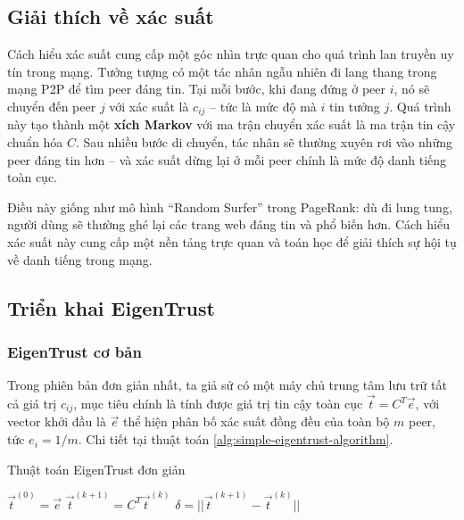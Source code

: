 \subsection{Giải thích về xác suất}

Cách hiểu xác suất cung cấp một góc nhìn trực quan cho quá trình lan truyền uy tín trong mạng. Tưởng tượng có một tác nhân ngẫu nhiên đi lang thang trong mạng P2P
để tìm peer đáng tin. Tại mỗi bước, khi đang đứng ở peer $i$, nó sẽ chuyển đến peer $j$ với xác suất là $c_{ij}$ -- tức là mức độ mà $i$ tin tưởng $j$.
Quá trình này tạo thành một \textbf{xích Markov} \cite{markov-chain} với ma trận chuyển xác suất là ma trận tin cậy chuẩn hóa $C$.
Sau nhiều bước di chuyển, tác nhân sẽ thường xuyên rơi vào những peer đáng tin hơn -- và xác suất dừng lại ở mỗi peer chính là mức độ danh tiếng toàn cục.

Điều này giống như mô hình ``Random Surfer'' \cite{random-suffer-model-pagerank} trong PageRank: dù đi lung tung, người dùng sẽ thường ghé lại các trang web đáng tin và phổ biến hơn.
Cách hiểu xác suất này cung cấp một nền tảng trực quan và toán học để giải thích sự hội tụ về danh tiếng trong mạng.

\subsection{Triển khai EigenTrust}

\subsubsection{EigenTrust cơ bản}

Trong phiên bản đơn giản nhất, ta giả sử có một máy chủ trung tâm lưu trữ tất cả giá trị $c_{ij}$, mục tiêu chính là tính được giá trị tin cậy toàn cục
$\vec{t} = C^{T}\vec{e}$, với vector khởi đầu là $\vec{e}$ thể hiện phân bố xác suất đồng đều của toàn bộ $m$ peer, tức $e_i = 1/m$.
Chi tiết tại thuật toán \ref{alg:simple-eigentrust-algorithm}.

\begin{algorithm}
  \caption{Thuật toán EigenTrust đơn giản}
  \label{alg:simple-eigentrust-algorithm}
  \begin{algorithmic}
    \small
    \State $\vec{t}^{(0)} = \vec{e}$
    \Repeat
    \State $\vec{t}^{(k+1)} = C^{T}\vec{t}^{(k)}$
    \State $\delta = || \vec{t}^{(k+1)} - \vec{t}^{(k)} ||$
    \Until{$\delta < \epsilon$}
  \end{algorithmic}
\end{algorithm}

